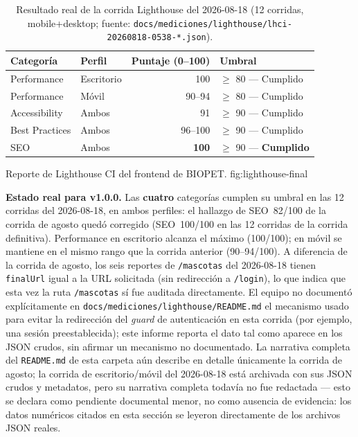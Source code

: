 \begin{table}[H]
  \centering
  \caption{Resultado real de la corrida Lighthouse del 2026-08-18 (12 corridas, mobile+desktop; fuente: \texttt{docs/mediciones/lighthouse/lhci-20260818-0538-*.json}).}
  \label{tab:lighthouse-final}
  \begin{tabular}{@{}llrl@{}}
    \toprule
    Categor\'ia & Perfil & Puntaje (0--100) & Umbral \\
    \midrule
    Performance & Escritorio & 100 & $\geq$ 80 --- Cumplido \\
    Performance & M\'ovil & 90--94 & $\geq$ 80 --- Cumplido \\
    Accessibility & Ambos & 91 & $\geq$ 90 --- Cumplido \\
    Best Practices & Ambos & 96--100 & $\geq$ 90 --- Cumplido \\
    SEO & Ambos & \textbf{100} & $\geq$ 90 --- \textbf{Cumplido} \\
    \bottomrule
  \end{tabular}
\end{table}

%
{Reporte de Lighthouse CI del frontend de BIOPET.}%
{fig:lighthouse-final}

\textbf{Estado real para v1.0.0.} Las \textbf{cuatro} categor\'ias cumplen
su umbral en las 12 corridas del 2026-08-18, en ambos perfiles: el hallazgo
de SEO~82/100 de la corrida de agosto qued\'o corregido (SEO~100/100 en las
12 corridas de la corrida definitiva). Performance en escritorio alcanza el
m\'aximo (100/100); en m\'ovil se mantiene en el mismo rango que la corrida
anterior (90--94/100). A diferencia de la corrida de agosto, los seis
reportes de \texttt{/mascotas} del 2026-08-18 tienen \texttt{finalUrl}
igual a la URL solicitada (sin redirecci\'on a \texttt{/login}), lo que
indica que esta vez la ruta \texttt{/mascotas} s\'i fue auditada
directamente. El equipo no document\'o expl\'icitamente en
\texttt{docs/mediciones/lighthouse/README.md} el mecanismo usado para
evitar la redirecci\'on del \emph{guard} de autenticaci\'on en esta
corrida (por ejemplo, una sesi\'on preestablecida); este informe reporta
el dato tal como aparece en los JSON crudos, sin afirmar un mecanismo no
documentado. La narrativa completa del \texttt{README.md} de esta carpeta
a\'un describe en detalle \'unicamente la corrida de agosto; la corrida de
escritorio/m\'ovil del 2026-08-18 est\'a archivada con sus JSON crudos y
metadatos, pero su narrativa completa todav\'ia no fue redactada --- esto
se declara como pendiente documental menor, no como ausencia de
evidencia: los datos num\'ericos citados en esta secci\'on se leyeron
directamente de los archivos JSON reales.

